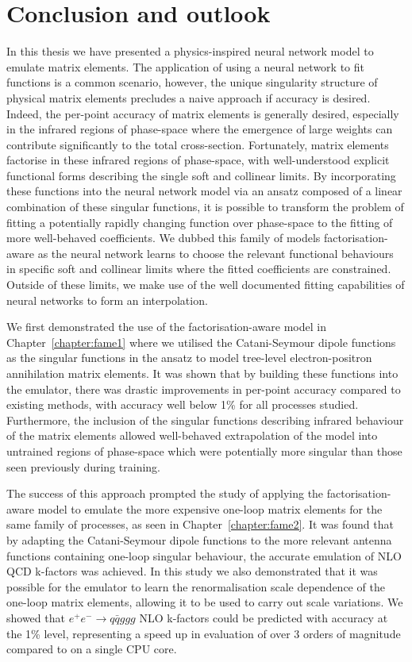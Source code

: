 \documentclass[main.tex]{subfiles}
\begin{document}
\chapter{Conclusion and outlook}
\label{chapter:conclusion}
In this thesis we have presented a physics-inspired
neural network model to emulate matrix elements. The
application of using a neural network to fit functions
is a common scenario, however, the unique singularity
structure of physical matrix elements precludes a naive
approach if accuracy is desired. Indeed, the per-point
accuracy of matrix elements is generally desired, especially
in the infrared regions of phase-space where the emergence of
large weights can contribute significantly to the total cross-section.
Fortunately, matrix elements factorise in these infrared
regions of phase-space, with well-understood explicit functional forms
describing the single soft and collinear limits.
By incorporating these functions into the neural network model via an
ansatz composed of a linear combination of these singular
functions, it is possible to transform the problem of fitting
a potentially rapidly changing function over phase-space
to the fitting of more well-behaved coefficients. We
dubbed this family of models factorisation-aware
as the neural network learns to choose the relevant
functional behaviours in specific soft and collinear limits
where the fitted coefficients are constrained. Outside
of these limits, we make use of the well documented fitting capabilities
of neural networks to form an interpolation.

We first demonstrated the use of the factorisation-aware
model in Chapter~\ref{chapter:fame1}
where we utilised the Catani-Seymour dipole functions as
the singular functions in the ansatz to model tree-level
electron-positron annihilation matrix elements. It was
shown that by building these functions into the emulator,
there was drastic improvements in per-point accuracy compared to
existing methods, with accuracy well below 1\% for all processes studied.
Furthermore, the inclusion of the singular
functions describing infrared behaviour of the matrix
elements allowed well-behaved extrapolation of the model
into untrained regions of phase-space which were potentially
more singular than those seen previously during training.

The success of this approach prompted the study of applying
the factorisation-aware model to emulate the more expensive
one-loop matrix elements for the same family of processes,
as seen in Chapter~\ref{chapter:fame2}.
It was found that by adapting the
Catani-Seymour dipole functions to the more relevant antenna functions
containing one-loop singular behaviour, the
accurate emulation of NLO QCD k-factors was achieved.
In this study we also demonstrated that it was possible
for the emulator to learn the renormalisation scale dependence
of the one-loop matrix elements, allowing it to be used to
carry out scale variations.
We showed that $e^{+}e^{-} \rightarrow q \bar{q} ggg$ NLO k-factors
could be predicted with accuracy at the 1\% level, representing a speed up in
evaluation of over 3 orders of magnitude compared to {\MadGraph} on
a single CPU core.
\end{document}
